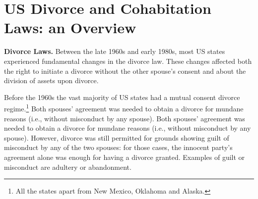 \documentclass[12pt]{article}
\numberwithin{table}{section}
\begin{document}
%
\section{US Divorce and Cohabitation Laws: an Overview} %
\textbf{Divorce Laws.} Between the late 1960s and early 1980s, most US states experienced fundamental changes in the divorce law. These changes affected both the right to initiate a divorce without the other spouse's consent and about the division of assets upon divorce.

Before the 1960s the vast majority of US states had a mutual consent divorce regime.\footnote{All the states apart from New Mexico, Oklahoma and Alaska.} Both spouses' agreement was needed to obtain a divorce for mundane reasons (i.e., without misconduct by any spouse). Both spouses' agreement was needed to obtain a divorce for mundane reasons (i.e., without misconduct by any spouse). However, divorce was still permitted for grounds showing guilt of misconduct by any of the two spouses: for those cases, the innocent party's agreement alone was enough for having a divorce granted. Examples of guilt or misconduct are adultery or abandonment.
\end{document}
